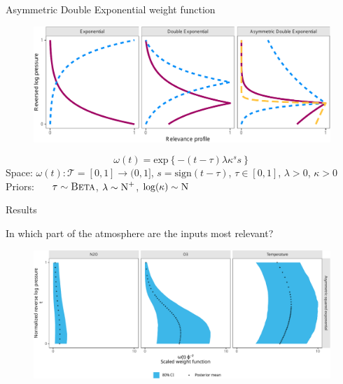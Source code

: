 \documentclass[final]{beamer}
\begin{document}
\begin{frame}[t]
{\begin{minipage}[t][76cm][t]{58cm}
{\begin{minipage}[t][50cm][t]{58cm}
          \begin{block}{Asymmetric Double Exponential weight function}
            \begin{figure}
              \centering
              \includegraphics[width=.85\linewidth]{inc/mls_weight_profiles}
            \end{figure}

            \begin{equation}
              \omega(t)
              =
              \text{exp}\left\{-(t - \tau)\lambda\kappa^s s\right\}
            \end{equation}
            Space:
            $\omega(t): \mathcal{T} = [0, 1] \to (0, 1]$,
            $s = \text{sign}(t - \tau)$,
            $\tau\in[0,1]$,
            $\lambda > 0$,
            $\kappa > 0$ \\
            Priors:
            $\indent\tau \sim \textsc{Beta}$,
            $\lambda \sim \textsc{N}^{+}$,
            $\log(\kappa) \sim \textsc{N}$
          \end{block}
        \end{minipage}
      }
    \end{minipage}%
  }
  \colorbox{blue!20}{
    \begin{minipage}[t][76cm][t]{58cm}
      Results
      \begin{block}{In which part of the atmosphere are the inputs most relevant?}
        \begin{figure}
          \centering
          \includegraphics[width=\textwidth]{inc/mmls_weight_posterior_mini1}
          \label{fig:mmls-weight-posterior-mini1}
        \end{figure}
      \end{block}


\end{minipage}}
\end{frame}
\end{document}
